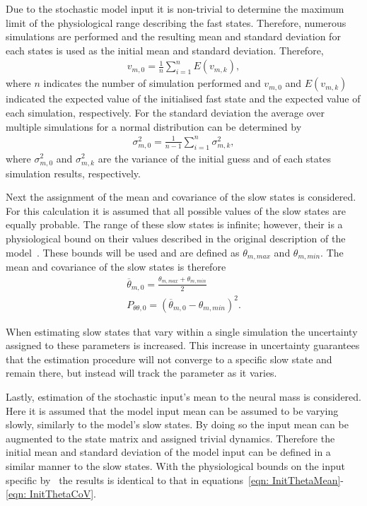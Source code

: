 Due to the stochastic model input it is non-trivial to determine the maximum limit of the physiological range describing the fast states. Therefore, numerous simulations are performed and the resulting mean and standard deviation for each states is used as the initial mean and standard deviation. Therefore, \begin{align}
v_{m,0} = \frac{1}{n}\sum\limits_{i=1}^n E(v_{m,k}), \end{align} where $n$ indicates the number of simulation performed and $v_{m,0}$ and $E(v_{m,k})$ indicated the expected value of the initialised fast state and the expected value of each simulation, respectively. For the standard deviation the average over multiple simulations for a normal distribution can be determined by \begin{align}
\sigma^2_{m,0} = \frac{1}{n-1}\sum\limits_{i=1}^n \sigma^2_{m,k},\end{align} where $\sigma^2_{m,0}$ and $\sigma^2_{m,k}$ are the variance of the initial guess and of each states simulation results, respectively.


Next the assignment of the mean and covariance of the slow states is considered. For this calculation it is assumed that all possible values of the slow states are equally probable. The range of these slow states is infinite; however, their is a physiological bound on their values described in the original description of the model~\citep{wendling2002epileptic}. These bounds will be used and are defined as $\theta_{m,max}$ and $\theta_{m,min}$. The mean and covariance of the slow states is therefore\begin{align}
\label{eqn: InitThetaMean}
\overline{\theta}_{m,0} = \frac{\theta_{m,max}+\theta_{m,min}}{2}\\
\label{eqn: InitThetaCoV}
P_{\theta\theta,0} = (\overline{\theta}_{m,0}-\theta_{m,min})^2.
\end{align}

When estimating slow states that vary within a single simulation the uncertainty assigned to these parameters is increased. This increase in uncertainty guarantees that the estimation procedure will not converge to a specific slow state and remain there, but instead will track the parameter as it varies. 

Lastly, estimation of the stochastic input's mean to the neural mass is considered. Here it is assumed that the model input mean can be assumed to be varying slowly, similarly to the model's slow states. By doing so the input mean can be augmented to the state matrix and assigned trivial dynamics. Therefore the initial mean and standard deviation of the model input can be defined in a similar manner to the slow states. With the physiological bounds on the input specific by~\cite{wendling2002epileptic} the results is identical to that in equations~\ref{eqn: InitThetaMean}-\ref{eqn: InitThetaCoV}. 

